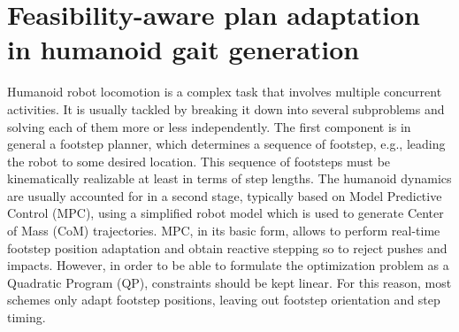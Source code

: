 \chapter{Feasibility-aware plan adaptation in humanoid gait generation}


Humanoid robot locomotion is a complex task that involves multiple concurrent activities. It is usually tackled by breaking it down into several subproblems and solving each of them more or less independently. The first component is in general a footstep planner, which determines a sequence of footstep, e.g., leading the robot to some desired location. This sequence of footsteps must be kinematically realizable at least in terms of step lengths. The humanoid dynamics are usually accounted for in a second stage, typically based on Model Predictive Control (MPC), using a simplified robot model which is used to generate Center of Mass (CoM) trajectories. MPC, in its basic form, allows to perform real-time footstep position adaptation \cite{HePeWi:10} and obtain reactive stepping so to  reject pushes and impacts. However, in order to be able to formulate the optimization problem as a Quadratic Program (QP), constraints should be kept linear. For this reason, most schemes only adapt footstep positions, leaving out footstep orientation and step timing.

